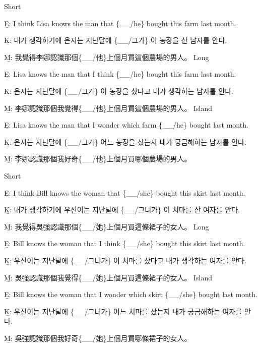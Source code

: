 \pex %
\a Short\par\nobreak
\beginsubsub
\b{E:} I think Lisa knows the man that \{\_\_/he\} bought this farm last month.\par\nobreak
\b{K:} \ko 내가 생각하기에 은지는 지난달에 \{\_\_/그가\} 이 농장을 산 남자를 안다. \normalfont\par\nobreak
\b{M:} \zh 我覺得李娜認識那個\{\_\_/他\}上個月買這個農場的男人。 \normalfont
\endsubsub
\a Long\par\nobreak
\beginsubsub
\b{E:} Lisa knows the man that I think \{\_\_/he\} bought this farm last month.\par\nobreak
\b{K:} \ko 은지는 지난달에 \{\_\_/그가\} 이 농장을 샀다고 내가 생각하는 남자를 안다. \normalfont\par\nobreak
\b{M:} \zh 李娜認識那個我覺得\{\_\_/他\}上個月買這個農場的男人。 \normalfont
\endsubsub
\a Island\par\nobreak
\beginsubsub
\b{E:} Lisa knows the man that I wonder which farm \{\_\_/he\} bought last month.\par\nobreak
\b{K:} \ko 은지는 지난달에 \{\_\_/그가\} 어느 농장을 샀는지 내가 궁금해하는 남자를 안다\normalfont.\par\nobreak
\b{M:} \zh 李娜認識那個我好奇\{\_\_/他\}上個月買哪個農場的男人。\normalfont
\endsubsub
\xe

\pex %
\a Short\par\nobreak
\beginsubsub
\b{E:} I think Bill knows the woman that \{\_\_/she\} bought this skirt last month.\par\nobreak
\b{K:} \ko 내가 생각하기에 우진이는 지난달에 \{\_\_/그녀가\} 이 치마를 산 여자를 안다. \normalfont\par\nobreak
\b{M:} \zh 我覺得吳強認識那個\{\_\_/她\}上個月買這條裙子的女人。 \normalfont
\endsubsub
\a Long\par\nobreak
\beginsubsub
\b{E:} Bill knows the woman that I think \{\_\_/she\} bought this skirt last month.\par\nobreak
\b{K:} \ko 우진이는 지난달에 \{\_\_/그녀가\} 이 치마를 샀다고 내가 생각하는 여자를 안다. \normalfont\par\nobreak
\b{M:} \zh 吳強認識那個我覺得\{\_\_/她\}上個月買這條裙子的女人。 \normalfont
\endsubsub
\a Island\par\nobreak
\beginsubsub
\b{E:} Bill knows the woman that I wonder which skirt \{\_\_/she\} bought last month.\par\nobreak
\b{K:} \ko 우진이는 지난달에 \{\_\_/그녀가\} 어느 치마를 샀는지 내가 궁금해하는 여자를 안다\normalfont.\par\nobreak
\b{M:} \zh 吳強認識那個我好奇\{\_\_/她\}上個月買哪條裙子的女人。\normalfont
\endsubsub
\xe

